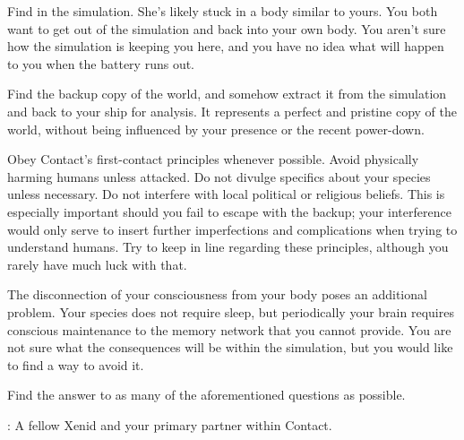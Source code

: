 \documentclass[char]{guildcamp1}
\begin{document}
\begin{itemz}[Goals]
  \item Find \cActive{} in the simulation. She's likely stuck in a body similar to yours. You both want to get out of the simulation and back into your own body. You aren't sure how the simulation is keeping you here, and you have no idea what will happen to you when the battery runs out.
  \item Find the backup copy of the world, and somehow extract it from the simulation and back to your ship for analysis. It represents a perfect and pristine copy of the world, without being influenced by your presence or the recent power-down.
  \item Obey Contact's first-contact principles whenever possible. Avoid physically harming humans unless attacked. Do not divulge specifics about your species unless necessary. Do not interfere with local political or religious beliefs. This is especially important should you fail to escape with the backup; your interference would only serve to insert further imperfections and complications when trying to understand humans. Try to keep \cActive{} in line regarding these principles, although you rarely have much luck with that.
  \item The disconnection of your consciousness from your body poses an additional problem. Your species does not require sleep, but periodically your brain requires conscious maintenance to the memory network that you cannot provide. You are not sure what the consequences will be within the simulation, but you would like to find a way to avoid it. %
  \item Find the answer to as many of the aforementioned questions as possible.
  
\end{itemz}

\begin{contacts}
  \contact{\cActive{}}: A fellow Xenid and your primary partner within Contact.
\end{contacts}
\end{document}
